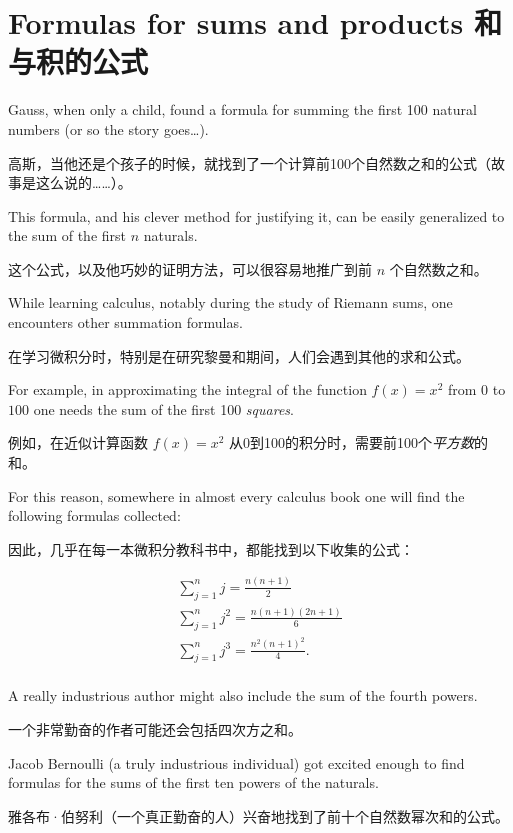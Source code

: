 

 
\newpage

\section{Formulas for sums and products 和与积的公式}
\label{sec:sums_prods}

Gauss, when only a child, found a formula for
summing the first 100 natural numbers (or so the story goes\ldots).

高斯，当他还是个孩子的时候，就找到了一个计算前100个自然数之和的公式（故事是这么说的……）。

This formula, and his clever method for justifying it, can be easily 
generalized to the sum of the first $n$ naturals.

这个公式，以及他巧妙的证明方法，可以很容易地推广到前 $n$ 个自然数之和。

While learning calculus, notably during the study of Riemann sums,
one encounters other summation formulas.

在学习微积分时，特别是在研究黎曼和期间，人们会遇到其他的求和公式。

For example, in approximating the
integral of the function $f(x)=x^2$ from $0$ to $100$ one needs the sum of 
the first 100 {\em squares}.

例如，在近似计算函数 $f(x)=x^2$ 从0到100的积分时，需要前100个{\em 平方数}的和。

For this reason, somewhere in almost
every calculus book one will find the following formulas collected:

因此，几乎在每一本微积分教科书中，都能找到以下收集的公式：

\begin{gather*}
\sum_{j=1}^n j = \frac{n(n+1)}{2}\\
\sum_{j=1}^n j^2 = \frac{n(n+1)(2n+1)}{6}\\
\sum_{j=1}^n j^3 = \frac{n^2(n+1)^2}{4}.\\
\end{gather*}

\noindent A really industrious author might also include the sum of the 
fourth powers.

\noindent 一个非常勤奋的作者可能还会包括四次方之和。

Jacob Bernoulli (a truly industrious individual)
got excited enough to find formulas for the sums of the first
ten powers of the naturals.

雅各布·伯努利（一个真正勤奋的人）兴奋地找到了前十个自然数幂次和的公式。

